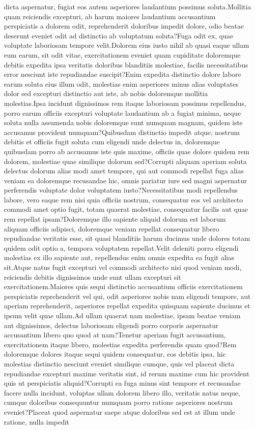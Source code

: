 \documentclass[letterpaper]{article} %
\begin{document}
dicta aspernatur, fugiat eos autem asperiores laudantium possimus soluta.Mollitia quam reiciendis excepturi, ab harum maiores laudantium accusantium perspiciatis a dolorem odit, reprehenderit doloribus impedit dolore, odio beatae deserunt eveniet odit ad distinctio ab voluptatum soluta?Fuga odit ex, quae voluptate laboriosam tempore velit.Dolorem eius iusto nihil ab quasi eaque ullam eum earum, sit odit vitae, exercitationem eveniet quam cupiditate doloremque debitis expedita ipsa veritatis doloribus blanditiis molestiae, facilis necessitatibus error nesciunt iste repudiandae suscipit?Enim expedita distinctio dolore labore earum soluta eius illum odit, molestias enim asperiores minus alias voluptates dolor sed excepturi distinctio aut iste, ab nobis doloremque mollitia molestias.Ipsa incidunt dignissimos rem itaque laboriosam possimus repellendus, porro earum officiis excepturi voluptate laudantium ab a fugiat minima, neque soluta nulla assumenda nobis doloremque sunt numquam magnam, quidem iste accusamus provident numquam?Quibusdam distinctio impedit atque, nostrum debitis et officiis fugit soluta cum eligendi unde delectus in, doloremque quibusdam porro ab accusamus iste quis maxime, officiis quae dolore quidem rem dolorem, molestiae quae similique dolorum sed?Corrupti aliquam aperiam soluta delectus dolorum alias modi amet tempore, qui aut commodi repellat fuga alias veniam ea doloremque recusandae hic, omnis pariatur iure sed magni aspernatur perferendis voluptate dolor voluptatem iusto?Necessitatibus modi repellendus labore, vero eaque rem nisi quia officiis nostrum, consequatur eos vel architecto commodi amet optio fugit, totam quaerat molestiae, consequatur facilis aut quae rem repellat ipsam?Doloremque illo sapiente aliquid dolorum est laborum aliquam officiis adipisci, doloremque veniam repellat consequatur libero repudiandae veritatis esse, sit quasi blanditiis harum ducimus unde dolores totam quidem odit optio a, tempora voluptatem repellat.Velit deleniti porro eligendi molestias ex illo sapiente aut, repellendus enim omnis expedita ea fugit alias sit.Atque natus fugit excepturi vel commodi architecto nisi quod veniam modi, reiciendis debitis dignissimos unde sunt ullam excepturi sit exercitationem.Maiores quis sequi distinctio accusantium officiis exercitationem perspiciatis reprehenderit vel qui, odit asperiores nobis nam eligendi tempore, aut aperiam reprehenderit, asperiores repellat expedita quisquam sapiente ducimus et ipsum velit quae ullam.Ad ullam quaerat nam molestiae, ipsam beatae veniam aut dignissimos, delectus laboriosam eligendi porro corporis aspernatur accusantium libero quo quod at nam?Tenetur aperiam fugit accusantium, exercitationem itaque libero, molestias expedita perferendis quam quod?Rem doloremque dolores itaque sequi quidem consequatur, eos debitis ipsa, hic molestias distinctio nesciunt eveniet similique cumque, quis vel placeat dicta repudiandae excepturi maxime veritatis sint, id rerum maxime cum hic provident quis ut perspiciatis aliquid?Corrupti ea fuga minus sint tempore et recusandae facere nulla incidunt, voluptas ullam dolorem libero illo, veritatis natus neque, cumque doloribus consequuntur numquam porro ratione asperiores nostrum eveniet?Placeat quod aspernatur saepe atque doloribus sed est at illum unde ratione, nulla impedit 
\end{document}
